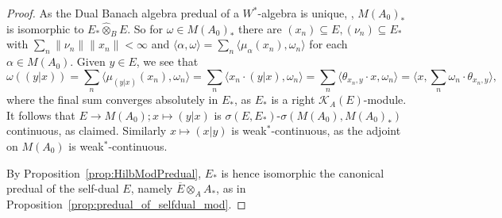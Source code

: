 \documentclass[a4paper,11pt]{article}
\theoremstyle{plain}
\theoremstyle{remark}
\newcommand{\mc}[1]{\mathcal{#1}}
\newcommand{\ip}[2]{{\langle {#1} , {#2} \rangle}}
\newcommand{\proten}{\widehat\otimes}
\begin{document}
\begin{proof}
As the Dual Banach algebra predual of a $W^*$-algebra is unique, \cite[Theorem~5.2]{DHW_conditions_wstar_top}, $M(A_0)_*$ is isomorphic to $E_* \proten_B E$.  So for $\omega\in M(A_0)_*$ there are $(x_n)\subseteq E, (\nu_n)\subseteq E_*$ with $\sum_n \|\nu_n\| \|x_n\| < \infty$ and $\ip{\alpha}{\omega} = \sum_n \ip{\mu_\alpha(x_n)}{\omega_n}$ for each $\alpha \in M(A_0)$.  Given $y\in E$, we see that
\[ \omega((y|x))
= \sum_n \ip{\mu_{(y|x)}(x_n)}{\omega_n} 
= \sum_n \ip{x_n \cdot (y|x)}{\omega_n} 
= \sum_n \ip{\theta_{x_n, y} \cdot x}{\omega_n} 
= \ip{x}{\sum_n \omega_n \cdot \theta_{x_n, y}}, \]
where the final sum converges absolutely in $E_*$, as $E_*$ is a right $\mc K_A(E)$-module.  It follows that $E \to M(A_0); x \mapsto (y|x)$ is $\sigma(E, E_*)$-$\sigma(M(A_0), M(A_0)_*)$ continuous, as claimed.  Similarly $x\mapsto (x|y)$ is weak$^*$-continuous, as the adjoint on $M(A_0)$ is weak$^*$-continuous.

By Proposition~\ref{prop:HilbModPredual}, $E_*$ is hence isomorphic the canonical predual of the self-dual $E$, namely $\overline E \proten_A A_*$, as in Proposition~\ref{prop:predual_of_selfdual_mod}.
\end{proof}


\clearpage


\end{document}
